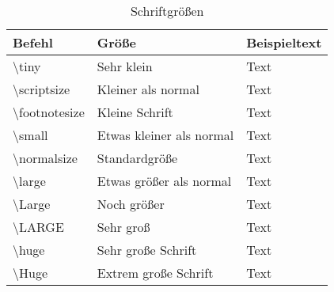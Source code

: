 \begin{table}[h]
    \centering
    \begin{tabular}{lll}
        \toprule
        \textbf{Befehl}             & \textbf{Größe}           & \textbf{Beispieltext} \\
        \midrule
        \textbackslash tiny         & Sehr klein               & {\tiny Text}          \\
        \textbackslash scriptsize   & Kleiner als normal       & {\scriptsize Text}    \\
        \textbackslash footnotesize & Kleine Schrift           & {\footnotesize Text}  \\
        \textbackslash small        & Etwas kleiner als normal & {\small Text}         \\
        \textbackslash normalsize   & Standardgröße            & {\normalsize Text}    \\
        \textbackslash large        & Etwas größer als normal  & {\large Text}         \\
        \textbackslash Large        & Noch größer              & {\Large Text}         \\
        \textbackslash LARGE        & Sehr groß                & {\LARGE Text}         \\
        \textbackslash huge         & Sehr große Schrift       & {\huge Text}          \\
        \textbackslash Huge         & Extrem große Schrift     & {\Huge Text}          \\
        \bottomrule
    \end{tabular}
    \caption{Schriftgrößen}
    \label{tab:schriftgroessen}
\end{table}